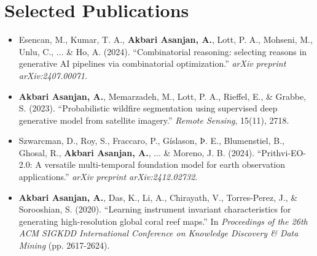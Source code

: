 \documentclass[11pt,a4paper]{article}
\begin{document}
\vspace{-2ex}
\section*{Selected Publications}
\begin{itemize}[nosep,leftmargin=*]
\item Esencan, M., Kumar, T. A., \textbf{Akbari Asanjan, A.}, Lott, P. A., Mohseni, M., Unlu, C., ... \& Ho, A. (2024). ``Combinatorial reasoning: selecting reasons in generative AI pipelines via combinatorial optimization.'' \textit{arXiv preprint arXiv:2407.00071}.
\item \textbf{Akbari Asanjan, A.}, Memarzadeh, M., Lott, P. A., Rieffel, E., \& Grabbe, S. (2023). ``Probabilistic wildfire segmentation using supervised deep generative model from satellite imagery.'' \textit{Remote Sensing}, 15(11), 2718.
\item Szwarcman, D., Roy, S., Fraccaro, P., Gíslason, Þ. E., Blumenstiel, B., Ghosal, R., \textbf{Akbari Asanjan, A.}, ... \& Moreno, J. B. (2024). ``Prithvi-EO-2.0: A versatile multi-temporal foundation model for earth observation applications.'' \textit{arXiv preprint arXiv:2412.02732}.
\item \textbf{Akbari Asanjan, A.}, Das, K., Li, A., Chirayath, V., Torres-Perez, J., \& Sorooshian, S. (2020). ``Learning instrument invariant characteristics for generating high-resolution global coral reef maps.'' In \textit{Proceedings of the 26th ACM SIGKDD International Conference on Knowledge Discovery \& Data Mining} (pp. 2617-2624).
\end{itemize}
\end{document}
